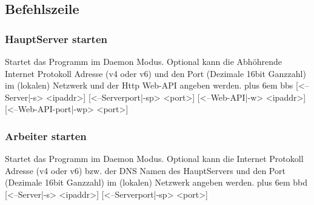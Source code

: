 \documentclass[a4paper,12pt]{article}
\makeatletter
\newenvironment{mycode}
 {\def\@xobeysp{\ }\verbatim\rightskip=0pt plus 6em\relax}
 {\endverbatim}
\makeatother
\begin{document}
\begin{center}
\end{center}

\clearpage


\clearpage

\subsection{Befehlszeile}

\subsubsection{Haupt\gls{Server} starten}
Startet das Programm im \gls{Daemon} Modus. Optional kann die Abhöhrende Internet Protokoll Adresse (v4 oder v6) und den Port (Dezimale 16bit Ganzzahl) im (lokalen) Netzwerk und der Http \gls{Web-API} angeben werden.
\begin{mycode}
bbs [<--\gls{Server}|-s> <ipaddr>] [<--\gls{Server}port|-sp> <port>] [<--\gls{Web-API}|-w> <ipaddr>] [<--\gls{Web-API}-port|-wp> <port>]
\end{mycode}

\subsubsection{Arbeiter starten}
Startet das Programm im \gls{Daemon} Modus. Optional kann die Internet Protokoll Adresse (v4 oder v6) bzw. der DNS Namen des Haupt\gls{Server}s und den Port (Dezimale 16bit Ganzzahl) im (lokalen) Netzwerk angeben werden.
\begin{mycode}
bbd [<--\gls{Server}|-s> <ipaddr>] [<--\gls{Server}port|-sp> <port>]
\end{mycode}
\end{document}
